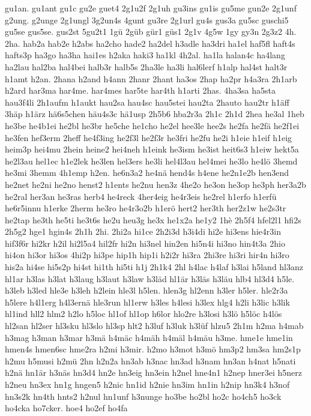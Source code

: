 {gu1an.
gu1ant
gu1c
gu2e
guet4
2g1u2f
2g1uh
gu3ins
gu1is
gu5me
gun2e
2g1unf
g2ung.
g2unge
2g1ungl
3g2un4s
4gunt
gu3re
2g1url
gu4s
gus3a
gu5sc
guschi5
gu5se
gus5se.
gus2st
5gu2t1
1gü
2güb
gür1
güs1
2g1v
4g5w
1gy
gy3n
2g3z2
4h.
2ha.
hab2a
hab2e
h2abs
ha2cho
hade2
ha2del
h3adle
ha3dri
ha1el
haf5fl
haft4s
hafts3p
ha3go
ha3ha
hai1es
h2aka
haki3
ha1kl
4h2al.
ha1la
halan4c
ha4lang
ha2lau
hal2ba
hal4bei
halb3r
halb5s
2ha3le
ha3li
hal6lerf
h1alp
hal4st
halt3r
h1amt
h2an.
2hana
h2and
h4ann
2hanr
2hant
ha3os
2hap
ha2pr
h4a3ra
2h1arb
h2ard
har3ma
har4me.
har4mes
har5te
har4th
h1arti
2has.
4ha3sa
ha5sta
hau3f4li
2h1aufm
h1aukt
hau2sa
hau4sc
hau5stei
hau2ta
2hauto
hau2tr
h1äff
3häp
h1ärz
hä6s5chen
häu4s3c
hä1usp
2h5b6
hba2r3a
2h1c
2h1d
2hea
he3al
1heb
he3be
he4b1ei
he2bl
he3br
he5che
he1cho
he2el
hee3le
hee2s
he2fa
he2fä
he2f1ei
he3fen
hef3erm
2heff
he4f3ing
he2f3l
he2f3r
he3fri
he2fu
he2i
h1eie
h1eif
h1eig
heim3p
hei4mu
2hein
heine2
hei4neh
h1eink
he3ism
he3ist
heit6s3
h1eiw
hekt5a
he2l3au
hel1ec
h1e2lek
he3len
hel3ers
he3li
hel4l3au
hel4mei
he3lo
he4lö
3hemd
he3mi
3hemm
4h1emp
h2en.
he6n3a2
he4nä
hend4s
h4ene
he2n1e2b
hen3end
he2net
he2ni
he2no
henst2
h1ents
he2nu
hen3z
4he2o
he3on
he3op
he3ph
her3a2b
he2ral
her3an
he3ras
herb4
he4reck
4her4eig
he4r3eis
he2rel
h1erfo
h1erfü
he6r5innu
h1erke
2herm
he3ro
he4r3o2b
h1erö
hert2
her3th
her2z1w
he2s3tr
he2tap
he3th
he5ti
he3t6s
he2u
heu3g
he3x
he1x2a
he1y2
1hè
2h5f4
hfel2l1
hfi2s
2h5g2
hge1
hgin4s
2h1h
2hi.
2hi2a
hi1ce
2h2i3d
h3i4di
hi2e
hi3ens
hie4r3in
hif3f6r
hi2kr
h2il
hi2l5a4
hil2fr
hi2n
hi3nel
hin2en
hi5n4i
hi3no
hin4t3a
2hio
hi4on
hi3or
hi3os
4hi2p
hi3pe
hip1h
hip1i
h2i2r
hi3ra
2hi3re
hi3ri
hir4n
hi3ro
his2a
hi4se
hi5s2p
hi4st
hi1th
hi5ti
h1j
2h1k4
2hl
h4lac
h4laf
h3lai
h5land
hl3anz
hl1ar
h3las
h3lat
h3laug
h3laut
h3law
h3läd
hl1är
h3läs
h3läu
hlb4
hl3d4
h5le.
h3leb
h3led
hle3e
h3leh
h2lein
hle3l
h5len.
hlen3g
hl2enn
h3ler
h5ler.
hle2r3a
h5lere
h4l1erg
h4l3ernä
hle3run
hl1erw
h3les
h4lesi
h3lex
hlg4
h2li
h3lic
h3lik
hl1ind
hll2
hlm2
h2lo
h5loc
hl1of
hl1op
h6lor
hlo2re
h3losi
h3lö
h5löc
h4lös
hl2san
hl2ser
hl3sku
hl3slo
hl3sp
hlt2
h3luf
h3luk
h3lüf
hlzu5
2h1m
h2ma
h4mab
h3mag
h3man
h3mar
h3mä
h4mäc
h4mäh
h4mäl
h4mäu
h3me.
hme1e
hme1in
hmen4s
hmen6sc
hme2ra
h2mi
h3mir.
h2mo
h3mot
h3mö
hm3p2
hm3sa
hm2s1p
h2mu
h5musi
h2mü
2hn
h2n2a
hn3ab
h3nac
hn3ad
h3nam
hn3an
h4nat
h5nati
h2nä
hn1är
h3näs
hn3d4
hn2e
hn3eig
hn3ein
h2nel
hne4n1
h2nep
hner3ei
h5nerz
h2neu
hn3ex
hn1g
hngen5
h2nic
hn1id
h2nie
hn3im
hn1in
h2nip
hn3k4
h3nof
hn3s2k
hn4th
hnts2
h2nul
hn1unf
h3nunge
ho3be
ho2bl
ho2c
ho4ch5
ho3ck
ho4cka
ho7cker.
hoe4
ho2ef
ho4fa
}
